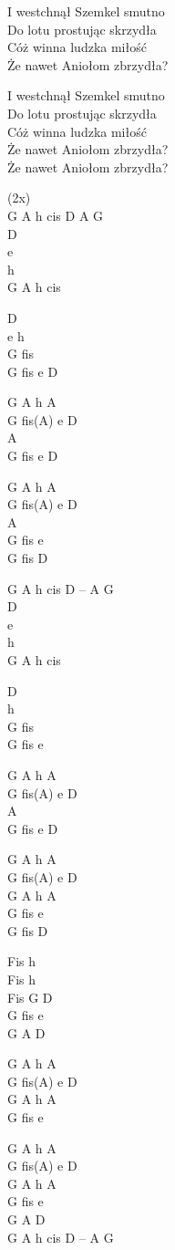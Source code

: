 \begin{text}
\vin I westchnął Szemkel smutno\\
\vin Do lotu prostując skrzydła\\
\vin Cóż winna ludzka miłość\\
\vin Że nawet Aniołom zbrzydła?

\vin I westchnął Szemkel smutno\\
\vin Do lotu prostując skrzydła\\
\vin Cóż winna ludzka miłość\\
\vin Że nawet Aniołom zbrzydła?\\
\vin Że nawet Aniołom zbrzydła?
\end{text}
\begin{chord}
(2x)\\
G A h cis D A G\\
D\\
e\\
h\\
G A h cis

D\\
e h\\
G fis\\
G fis e D

\vin G A h A\\
\vin G fis(A) e D\\
\vin A\\
\vin G fis e D

\vin G A h A\\
\vin G fis(A) e D\\
\vin A\\
\vin G fis e\\
\vin G fis D

G A h cis D – A G\\
D\\
e\\
h\\
G A h cis

D\\
h\\
G fis\\
G fis e

\vin G A h A\\
\vin G fis(A) e D\\
\vin A\\
\vin G fis e D

\vin G A h A\\
\vin G fis(A) e D\\
\vin G A h A\\
\vin G fis e\\
\vin G fis D

Fis h\\
Fis h\\
Fis G D\\
G fis e\\
G A D

\vin G A h A\\
\vin G fis(A) e D\\
\vin G A h A\\
\vin G fis e

\vin G A h A\\
\vin G fis(A) e D\\
\vin G A h A\\
\vin G fis e\\
\vin G A D\\
G A h cis D – A G
\end{chord}
